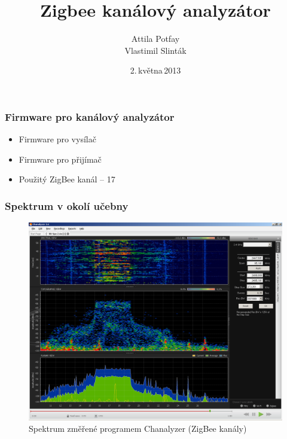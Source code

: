 \documentclass{beamer}
\title{Zigbee kanálový analyzátor}
\author[Potfay, Slinták]{Attila Potfay\\Vlastimil Slinták}
\institute[MSSY]{%
MSSY -- Bezdrátové senzorové sítě
}
\date{2.\,května\,2013}
\begin{document}
	\frame{\titlepage}

	\begin{frame}
	\frametitle{Firmware pro kanálový analyzátor}
	\begin{itemize}
	\item Firmware pro vysílač
	\item Firmware pro přijímač
	\item Použitý ZigBee kanál -- 17
	\end{itemize}
	\end{frame}

	\begin{frame}
	\frametitle{Spektrum v okolí učebny}
	\begin{figure}[!ht]
	\centering%
	\includegraphics[scale=0.2, keepaspectratio]{spektrum}%
	\caption{Spektrum změřené programem Chanalyzer (ZigBee kanály)}
	\end{figure}
	\end{frame}
\end{document}
